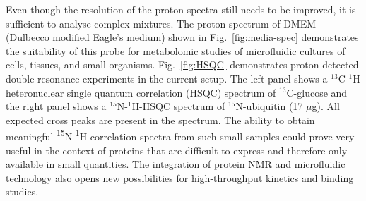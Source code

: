 \documentclass[preprint,5p]{elsarticle}
\newcommand{\fig}[1]{Fig.~\ref{#1}}
\begin{document}
Even though the resolution of the proton spectra still needs to be improved, it
is sufficient to analyse complex mixtures. \cbdelete The proton spectrum of DMEM (Dulbecco
modified Eagle's medium) shown in \fig{fig:media-spec} demonstrates the suitability of this
probe for metabolomic studies of microfluidic cultures of cells, tissues, and
small organisms.
\cbdelete
\fig{fig:HSQC} demonstrates proton-detected double resonance experiments in the
current setup. The left panel shows a $^{13}$C-$^{1}$H heteronuclear single
quantum correlation (HSQC) spectrum of $^{13}$C-glucose and the right panel shows a $^{15}$N-$^{1}$H-HSQC spectrum of $^{15}$N-ubiquitin (17 $\mu$g). All
expected cross peaks are present in the spectrum. The ability to obtain
meaningful  \textsuperscript{15}N-\textsuperscript{1}H correlation spectra from
such small samples could prove very useful in the context of proteins that are
difficult to express and therefore only available in small quantities. The
integration of protein NMR and microfluidic technology also opens new
possibilities for high-throughput kinetics and binding studies.
\end{document}
